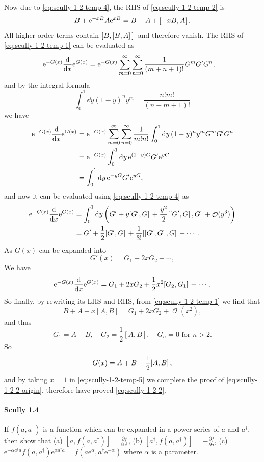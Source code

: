 \documentclass[hyperref, a4paper]{article}
\newcommand*{\ee}{\mathrm{e}}
\DeclareMathOperator{\bigO}{\mathcal{O}}
\begin{document}
Now due to \eqref{eq:scully-1-2-temp-4}, the RHS of \eqref{eq:scully-1-2-temp-2} is 
\[
    B + \ee^{-xB} A \ee^{xB} = B + A + \comm*{-xB}{A}.
\]
All higher order terms contain $\comm*{B}{\comm*{B}{A}}$ and therefore vanish.
The RHS of \eqref{eq:scully-1-2-temp-1} can be evaluated as
\[
    \begin{aligned}
        \ee^{-G(x)} \dv{x} \ee^{G(x)} &= \ee^{-G(x)} \sum_{m=0}^\infty \sum_{n=0}^\infty \frac{1}{(m+n+1)!} G^m G' G^n ,
    \end{aligned}
\]
and by the integral formula 
\[
    \int_{0}^{1} \dd y(1-y)^{n} y^{m}=\frac{n ! m !}{(n+m+1) !}
\]
we have 
\[
    \begin{aligned}
        \ee^{-G(x)} \dv{x} \ee^{G(x)} &= \ee^{-G(x)} \sum_{m=0}^\infty \sum_{n=0}^\infty \frac{1}{m! n!} \int_{0}^{1} \dd{y} (1-y)^{n} y^{m} G^m G' G^n \\
        &= \ee^{-G(x)} \int_{0}^{1} \dd{y} \ee^{(1-y) G} G' \ee^{yG} \\
        &= \int_{0}^{1} \dd{y} \ee^{-y G} G' \ee^{yG} ,
    \end{aligned}
\]
and now it can be evaluated using \eqref{eq:scully-1-2-temp-4} as
\[
    \begin{aligned}
        \ee^{-G(x)} \dv{x} \ee^{G(x)} &= \int_0^1 \dd{y} \left( G' + y \comm*{G'}{G} + \frac{y^2}{2} \comm*{\comm*{G'}{G}}{G} + \bigO(y^3) \right) \\
        &= G' + \frac{1}{2} \comm*{G'}{G}  + \frac{1}{3!} \comm*{\comm*{G'}{G}}{G} + \cdots.
    \end{aligned}
\]
As $G(x)$ can be expanded into
\[
    G'(x) = G_1 + 2x G_2 + \cdots,
\]
We have
\[
    \ee^{-G(x)} \dv{x} \ee^{G(x)} = G_1 + 2 x G_2 + \frac{1}{2} x^2 \comm*{G_2}{G_1} + \cdots.
\]
So finally, by rewriting its LHS and RHS, from \eqref{eq:scully-1-2-temp-1} we find that 
\[
    B + A + x [A, B] = G_1 + 2 x G_2 + \bigO(x^2),
\]
and thus
\[
    G_1 = A + B, \quad G_2 = \frac{1}{2} [A, B], \quad G_{n} = 0 \text{ for $n > 2$}.
\]
So 
\[
    G(x) = A + B + \frac{1}{2} \comm*{A}{B},
\]
and by taking $x=1$ in \eqref{eq:scully-1-2-temp-5} we complete the proof of \eqref{eq:scully-1-2-2-origin}, therefore have proved \eqref{eq:scully-1-2-2}.

\paragraph{Scully 1.4} If $f\left(a, a^{\dagger}\right)$ is a function which can be expanded in a power series of $a$ and $a^{\dagger}$, then show that
(a) $\left[a, f\left(a, a^{\dagger}\right)\right]=\frac{\partial f}{\partial a^{\dagger}}$,
(b) $\left[a^{\dagger}, f\left(a, a^{\dagger}\right)\right]=-\frac{\partial f}{\partial a}$,
(c) $\ee^{-\alpha a^{\dagger} a} f\left(a, a^{\dagger}\right) \ee^{\alpha a^{\dagger} a}=f\left(a \ee^{\alpha}, a^{\dagger} \ee^{-\alpha}\right)$
where $\alpha$ is a parameter.
\end{document}
